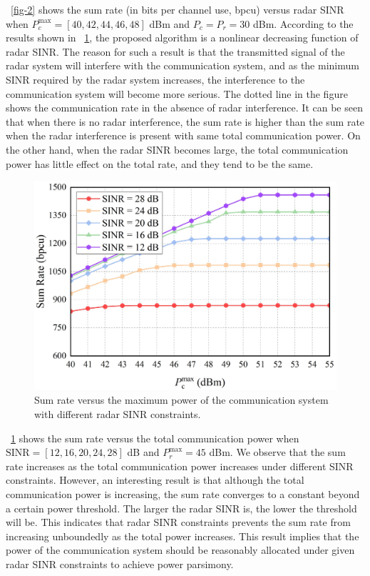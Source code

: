 \documentclass[a4paper,journal,10pt]{IEEEtran}
\begin{document}
\figurename~\ref{fig-2} shows the sum rate (in bits per channel use, bpcu) versus radar SINR when $P_c^{\max} = [40,42,44,46,48]$ dBm and $P_c = P_r =30$ dBm. According to the results shown in \figurename~\ref{fig-3}, the proposed algorithm is a nonlinear decreasing function of radar SINR. The reason for such a result is that the transmitted signal of the radar system will interfere with the communication system, and as the minimum SINR required by the radar system increases, the interference to the communication system will become more serious. The dotted line in the figure shows the communication rate in the absence of radar interference. It can be seen that when there is no radar interference, the sum rate is higher than the sum rate when the radar interference is present with same total communication power.
On the other hand, when the radar SINR becomes large, the total communication power has little effect on the total rate, and they tend to be the same.

\begin{figure}[t]
	\centering
	\includegraphics[width=0.85\columnwidth]{Figure/1.jpg}%
	\caption{Sum rate versus the maximum power of the communication system with different radar SINR constraints.}
 \vspace{-3mm}
	\label{fig-3}
\end{figure}

\figurename~\ref{fig-3} shows the sum rate versus the total communication power when $\mathrm{SINR} = [12,16,20,24,28]$ dB and $P_r^{\max} = 45$ dBm. We observe that the sum rate increases as the total communication power increases under different SINR constraints. However, an interesting result is that although the total communication power is increasing, the sum rate converges to a constant beyond a certain power threshold. The larger the radar SINR is, the lower the threshold will be. This indicates that radar SINR constraints prevents the sum rate from increasing unboundedly as the total power increases. This result implies that the power of the communication system should be reasonably allocated under given radar SINR constraints to achieve power parsimony.
\end{document}
